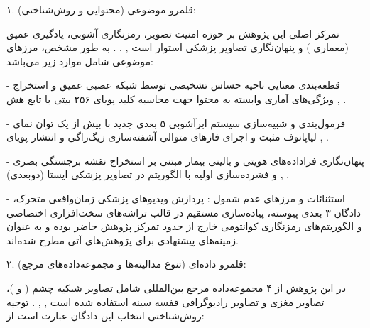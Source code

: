 

۱. قلمرو موضوعی (محتوایی و روش‌شناختی):\par

تمرکز اصلی این پژوهش بر حوزه امنیت تصویر، رمزنگاری آشوبی، یادگیری عمیق (معماری ) و پنهان‌نگاری تصاویر پزشکی استوار است , , . به طور مشخص، مرزهای موضوعی شامل موارد زیر می‌باشد:\par

{-} قطعه‌بندی معنایی ناحیه حساس تشخیصی  توسط شبکه عصبی عمیق  و استخراج ویژگی‌های آماری وابسته به محتوا جهت محاسبه کلید پویای ۲۵۶ بیتی با تابع هش  , .\par

{-} فرمول‌بندی و شبیه‌سازی سیستم ابرآشوبی ۵ بعدی جدید با بیش از یک توان نمای لیاپانوف مثبت و اجرای فازهای متوالی آشفته‌سازی زیگ‌زاگی  و انتشار پویای   , .\par

{-} پنهان‌نگاری فراداده‌های هویتی و بالینی بیمار مبتنی بر استخراج نقشه برجستگی بصری  و فشرده‌سازی اولیه با الگوریتم  در تصاویر پزشکی ایستا (دو‌بعدی) , .\par

{-} استثنائات و مرزهای عدم شمول : پردازش ویدیوهای پزشکی زمان‌واقعی متحرک، دادگان ۳ بعدی پیوسته، پیاده‌سازی مستقیم در قالب تراشه‌های سخت‌افزاری اختصاصی  و الگوریتم‌های رمزنگاری کوانتومی خارج از حدود تمرکز پژوهش حاضر بوده و به عنوان زمینه‌های پیشنهادی برای پژوهش‌های آتی مطرح شده‌اند.\par



۲. قلمرو داده‌ای (تنوع مدالیته‌ها و مجموعه‌داده‌های مرجع):\par

در این پژوهش از ۴ مجموعه‌داده مرجع بین‌المللی شامل تصاویر شبکیه چشم ( و )، تصاویر  مغزی  و تصاویر رادیوگرافی قفسه سینه  استفاده شده است , , . توجیه روش‌شناختی انتخاب این دادگان عبارت است از:\par

